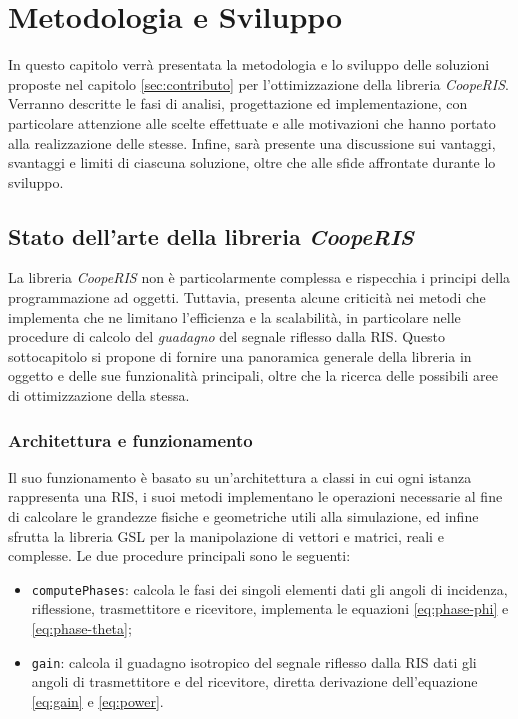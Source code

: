 \chapter{Metodologia e Sviluppo}
\label{ch:metodologiasviluppo}

In questo capitolo verrà presentata la metodologia e lo sviluppo delle soluzioni
proposte nel capitolo \ref{sec:contributo} per l'ottimizzazione della libreria
\textit{CoopeRIS}. Verranno descritte le fasi di analisi, progettazione ed implementazione,
con particolare attenzione alle scelte effettuate e alle motivazioni che hanno
portato alla realizzazione delle stesse. Infine, sarà presente una discussione
sui vantaggi, svantaggi e limiti di ciascuna soluzione, oltre che alle sfide
affrontate durante lo sviluppo.

\section{Stato dell'arte della libreria \textit{CoopeRIS}}
\label{sec:libreria}

La libreria \textit{CoopeRIS} non è particolarmente complessa e rispecchia i
principi della programmazione ad oggetti. Tuttavia, presenta alcune criticità
nei metodi che implementa che ne limitano l'efficienza e la scalabilità, in particolare
nelle procedure di calcolo del \textit{guadagno} del segnale riflesso dalla RIS.
Questo sottocapitolo si propone di fornire una panoramica generale della libreria
in oggetto e delle sue funzionalità principali, oltre che la ricerca delle
possibili aree di ottimizzazione della stessa.

\subsection{Architettura e funzionamento}
\label{sec:architettura}

Il suo funzionamento è basato su un'architettura a classi in cui ogni istanza rappresenta
una RIS, i suoi metodi implementano le operazioni necessarie al fine di
calcolare le grandezze fisiche e geometriche utili alla simulazione, ed infine sfrutta
la libreria GSL\cite{gnugsl} per la manipolazione di vettori e matrici, reali e complesse.
Le due procedure principali sono le seguenti:

\begin{itemize}
  \item \texttt{computePhases}: calcola le fasi dei singoli elementi dati gli angoli
    di incidenza, riflessione, trasmettitore e ricevitore, implementa le
    equazioni \ref{eq:phase-phi} e \ref{eq:phase-theta};

  \item \texttt{gain}: calcola il guadagno isotropico del segnale riflesso dalla
    RIS dati gli angoli di trasmettitore e del ricevitore, diretta derivazione
    dell'equazione \ref{eq:gain} e \ref{eq:power}.
\end{itemize}

